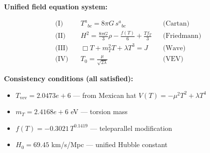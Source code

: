 
\textbf{Unified field equation system:}

\begin{align}
  \text{(I)} \quad & T^a{}_{bc} = 8\pi G \, s^a{}_{bc} && \text{(Cartan)} \\
  \text{(II)} \quad & H^2 = \frac{8\pi G}{3}\rho - \frac{f(T)}{6} + \frac{Tf_T}{3} && \text{(Friedmann)} \\
  \text{(III)} \quad & \Box T + m_T^2 T + \lambda T^3 = J && \text{(Wave)} \\
  \text{(IV)} \quad & T_0 = \frac{\mu}{\sqrt{2\lambda}} && \text{(VEV)}
\end{align}

\textbf{Consistency conditions (all satisfied):}
\begin{itemize}
  \item $T_{\text{vev}} = 2.0473e+6$ — from Mexican hat $V(T) = -\mu^2 T^2 + \lambda T^4$
  \item $m_T = 2.4168e+6$ eV — torsion mass
  \item $f(T) = -0.3021 \, T^{0.1419}$ — teleparallel modification
  \item $H_0 = 69.45$ km/s/Mpc — unified Hubble constant
\end{itemize}